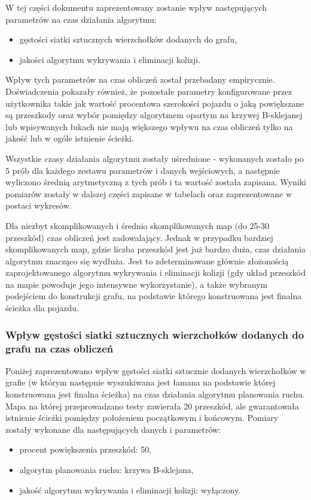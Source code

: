 \documentclass[a4paper,11pt,twoside]{report}
\theoremstyle{definition}
\begin{document}
W tej części dokumentu zaprezentowany zostanie wpływ następujących parametrów na czas działania algorytmu:
\begin{itemize}
	\item gęstości siatki sztucznych wierzchołków dodanych do grafu,
	\item jakości algorytmu wykrywania i eliminacji kolizji.
\end{itemize}

Wpływ tych parametrów na czas obliczeń został przebadany empirycznie. Doświadczenia pokazały również, że pozostałe parametry konfigurowane przez użytkownika takie jak wartość procentowa szerokości pojazdu o jaką powiększane są przeszkody oraz wybór pomiędzy algorytmem opartym na krzywej B-sklejanej lub wpisywanych łukach nie mają większego wpływu na czas obliczeń tylko na jakość lub w ogóle istnienie ścieżki.

Wszystkie czasy działania algorytmu zostały uśrednione - wykonanych zostało po 5 prób dla każdego zestawu parametrów i danych wejściowych, a następnie wyliczono średnią arytmetyczną z tych prób i ta wartość została zapisana. Wyniki pomiarów zostały w dalszej części zapisane w tabelach oraz zaprezentowane w postaci wykresów.

Dla niezbyt skomplikowanych i średnio skomplikowanych map (do 25-30 przeszkód) czas obliczeń jest zadowalający. Jednak w przypadku bardziej skomplikowanych map, gdzie liczba przeszkód jest już bardzo duża, czas działania algorytmu znacząco się wydłuża. Jest to zdeterminowane głównie złożonością zaprojektowanego algorytmu wykrywania i eliminacji kolizji (gdy układ przeszkód na mapie powoduje jego intensywne wykorzystanie), a także wybranym podejściem do konstrukcji grafu, na podstawie którego konstruowana jest finalna ścieżka dla pojazdu.

\subsubsection{Wpływ gęstości siatki sztucznych wierzchołków dodanych do grafu na czas obliczeń}

Poniżej zaprezentowano wpływ gęstości siatki sztucznie dodanych wierzchołków w grafie (w którym następnie wyszukiwana jest łamana na podstawie której konstruowana jest finalna ścieżka) na czas działania algorytmu planowania ruchu. Mapa na której przeprowadzano testy zawierała 20 przeszkód, ale gwarantowała istnienie ścieżki pomiędzy położeniem początkowym i końcowym. Pomiary zostały wykonane dla następujących danych i parametrów:
\begin{itemize}
	\item procent powiększenia przeszkód: 50,
	\item algorytm planowania ruchu: krzywa B-sklejana,
	\item jakość algorytmu wykrywania i eliminacji kolizji: wyłączony.
\end{itemize}
\end{document}
